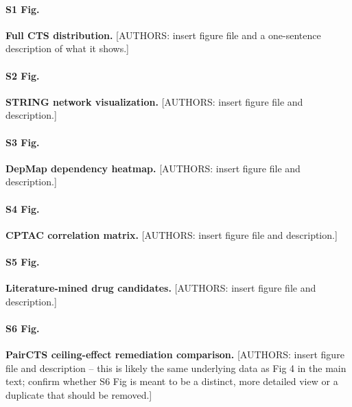 \documentclass[10pt,letterpaper]{article}
\begin{document}
\paragraph*{S1 Fig.}
\label{S1_Fig}
\textbf{Full CTS distribution.} [AUTHORS: insert figure file and a one-sentence
description of what it shows.]

\paragraph*{S2 Fig.}
\label{S2_Fig}
\textbf{STRING network visualization.} [AUTHORS: insert figure file and description.]

\paragraph*{S3 Fig.}
\label{S3_Fig}
\textbf{DepMap dependency heatmap.} [AUTHORS: insert figure file and description.]

\paragraph*{S4 Fig.}
\label{S4_Fig}
\textbf{CPTAC correlation matrix.} [AUTHORS: insert figure file and description.]

\paragraph*{S5 Fig.}
\label{S5_Fig}
\textbf{Literature-mined drug candidates.} [AUTHORS: insert figure file and description.]

\paragraph*{S6 Fig.}
\label{S6_Fig}
\textbf{PairCTS ceiling-effect remediation comparison.} [AUTHORS: insert figure file and
description -- this is likely the same underlying data as Fig 4 in the main text; confirm
whether S6 Fig is meant to be a distinct, more detailed view or a duplicate that should be
removed.]

\nolinenumbers


\end{document}
